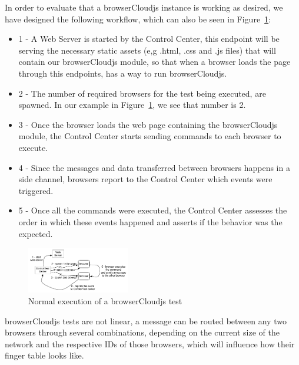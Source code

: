 
In order to evaluate that a browserCloudjs instance is working as desired, we have designed the following workflow, which can also be seen in Figure~\ref{fig:t-f-1}:

\begin{itemize}
    \item 1 - A Web Server is started by the Control Center, this endpoint will be serving the necessary static assets (e,g .html, .css and .js files) that will contain our browserCloudjs module, so that when a browser loads the page through this endpoints, has a way to run browserCloudjs.
    \item 2 - The number of required browsers for the test being executed, are spawned. In our example in Figure~\ref{fig:t-f-1}, we see that number is 2.
    \item 3 - Once the browser loads the web page containing the browserCloudjs module, the Control Center starts sending commands to each browser to execute.
    \item 4 - Since the messages and data transferred between browsers happens in a side channel, browsers report to the Control Center which events were triggered.
    \item 5 - Once all the commands were executed, the Control Center assesses the order in which these events happened and asserts if the behavior was the expected.
\end{itemize}

\begin{figure}[h!]
  \centering
  \includegraphics[width=0.4\textwidth]{figs/testing-framework-1}
  \caption{Normal execution of a browserCloudjs test}
  \label{fig:t-f-1}
\end{figure}


browserCloudjs tests are not linear, a message can be routed between any two browsers through several combinations, depending on the current size of the network and the respective IDs of those browsers, which will influence how their finger table looks like.

